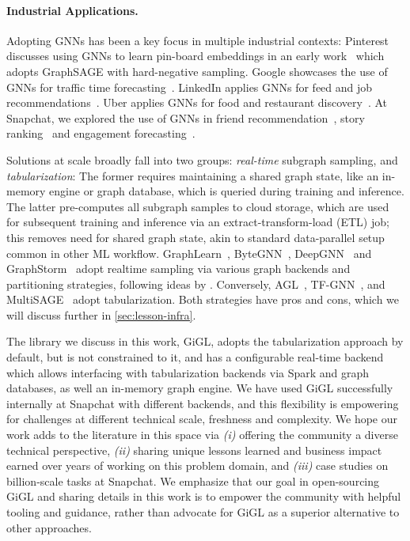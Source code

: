 \paragraph{Industrial Applications.}
Adopting GNNs has been a key focus in multiple industrial contexts: Pinterest discusses using GNNs to learn pin-board embeddings in an early work~\cite{ying2018graph} which adopts GraphSAGE with hard-negative sampling.  Google showcases the use of GNNs for traffic time forecasting~\cite{derrow2021eta}.  LinkedIn applies GNNs for feed and job recommendations~\cite{borisyuk2024lignn, liu2024linksage}. Uber applies GNNs for food and restaurant discovery~\cite{jain2019food}. At Snapchat, we explored the use of GNNs in friend recommendation~\cite{shi2023embedding, kung2024improving, sankar2021graph}, story ranking~\cite{tang2022friend} and engagement forecasting~\cite{tang2020knowing}. 

Solutions at scale broadly fall into two groups: \emph{real-time} subgraph sampling, and \emph{tabularization}: The former requires maintaining a shared graph state, like an in-memory engine or graph database, which is queried during training and inference.  The latter pre-computes all subgraph samples to cloud storage, which are used for subsequent training and inference via an extract-transform-load (ETL) job; this removes need for shared graph state, akin to standard data-parallel setup common in other ML workflow.
GraphLearn~\citep{zhu2019aligraph}, ByteGNN~\cite{zheng2022bytegnn}, DeepGNN~\cite{samylkin2022deepgnn} and GraphStorm~\cite{zheng2024graphstorm} adopt realtime sampling via various graph backends and partitioning strategies, following ideas by \citet{chiang2019cluster, karypis1997metis}. Conversely, AGL~\cite{zhang13agl}, TF-GNN~\cite{ferludin2022tf}, and MultiSAGE~\cite{yang2020multisage} adopt tabularization.  Both strategies have pros and cons, which we will discuss further in \cref{sec:lesson-infra}. 

The library we discuss in this work, GiGL, adopts the tabularization approach by default, but is not constrained to it, and has a configurable real-time backend which allows interfacing with tabularization backends via Spark and graph databases, as well an in-memory graph engine. We have used GiGL successfully internally at Snapchat with different backends, and this flexibility is empowering for challenges at different technical scale, freshness and complexity. We hope our work adds to the literature in this space via \emph{(i)} offering the community a diverse technical perspective, \emph{(ii)} sharing unique lessons learned and business impact earned over years of working on this problem domain, and \emph{(iii)} case studies on billion-scale tasks at Snapchat.  We emphasize that our goal in open-sourcing GiGL and sharing details in this work is to empower the community with helpful tooling and guidance, rather than advocate for GiGL as a superior alternative to other approaches.

